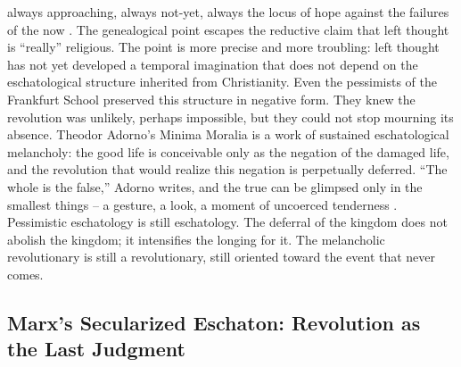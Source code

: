 always approaching, always not-yet, always the locus of hope against the failures of the now \cite[pp.~81-96]{derrida_1993}. The genealogical point escapes the reductive claim that left thought is “really” religious. The point is more precise and more troubling: left thought has not yet developed a temporal imagination that does not depend on the eschatological structure inherited from Christianity. Even the pessimists of the Frankfurt School preserved this structure in negative form. They knew the revolution was unlikely, perhaps impossible, but they could not stop mourning its absence. Theodor Adorno’s Minima Moralia is a work of sustained eschatological melancholy: the good life is conceivable only as the negation of the damaged life, and the revolution that would realize this negation is perpetually deferred. “The whole is the false,” Adorno writes, and the true can be glimpsed only in the smallest things – a gesture, a look, a moment of uncoerced tenderness \cite[p.~50]{adorno_1951}. Pessimistic eschatology is still eschatology. The deferral of the kingdom does not abolish the kingdom; it intensifies the longing for it. The melancholic revolutionary is still a revolutionary, still oriented toward the event that never comes.

\subsection{Marx’s Secularized Eschaton: Revolution as the Last Judgment}

